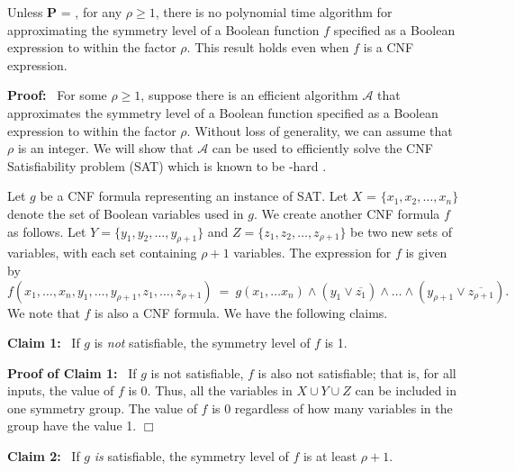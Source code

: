 \newcommand{\cala}{\mbox{$\mathcal{A}$}}

\begin{theorem}\label{thm:approx_sym_level_hard}
Unless \textbf{P} = \cnp,
for any $\rho \geq 1$, there is no polynomial time 
algorithm for approximating the 
symmetry level of a Boolean function $f$ 
specified as a Boolean expression to within the factor $\rho$.
This result holds even when $f$ is a CNF expression.
\end{theorem}

\noindent
\textbf{Proof:}~ For some $\rho \geq 1$, suppose there is an efficient algorithm \cala{} 
that approximates the symmetry level of a Boolean function
specified as a Boolean expression to within the factor $\rho$.
Without loss of generality, we can assume that $\rho$ is an integer.
We will show that \cala{} can be used to efficiently solve
the CNF Satisfiability problem (SAT) which is known 
to be \cnp-hard \cite{GJ-1979}.

Let $g$ be a CNF formula representing an instance of SAT.
Let $X$ = $\{x_1, x_2, \ldots, x_n\}$ denote the set of
Boolean variables used in $g$.
We create another CNF formula $f$ as follows.
Let $Y = \{y_1, y_2, \ldots, y_{\rho+1}\}$ and
$Z = \{z_1, z_2, \ldots, z_{\rho+1}\}$ be two 
new sets of variables, with each set containing $\rho+1$ variables.
The expression for $f$ is given by
\[
f(x_1, \ldots, x_n, y_1, \ldots, y_{\rho+1},
z_1, \ldots, z_{\rho+1}) ~=~ 
    g(x_1, \ldots x_n) \wedge (y_1 \vee \overline{z_1}) \wedge \ldots \wedge
                              (y_{\rho+1} \vee \overline{z_{\rho+1}}).
\]
We note that $f$ is also a CNF formula.
We have the following claims.

\medskip

\noindent
\textbf{Claim 1:}~ If $g$ is \emph{not} satisfiable, 
the symmetry level of $f$ is 1.

\smallskip

\noindent
\textbf{Proof of Claim 1:}~ If $g$ is not satisfiable, $f$ is also
not satisfiable; that is, for all inputs, the value of $f$ is 0.
Thus, all the variables in $X \cup Y \cup Z$ can be included in one
symmetry group.
The value of $f$ is 0 regardless of how many variables in the
group have the value 1.  \hfill$\Box$

\medskip

\noindent
\textbf{Claim 2:}~ If $g$ \emph{is} satisfiable, 
the symmetry level of $f$ is at least $\rho+1$.

\smallskip

